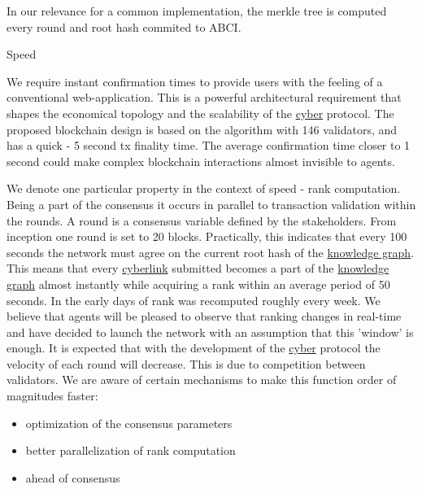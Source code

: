 \documentclass[8pt,oneside]{amsart}
\makeatletter
\newcommand{\linkred}[2]{\href{#1}{\color{red}{#2}}}
\newcommand{\linkgreen}[2]{\href{#1}{\color{green}{#2}}}
\renewcommand\subsection{\@startsection{subsection}
                                    {2}{\z@}
                                    {-3.25ex\@plus -1ex \@minus -.2ex}
                                    {0ex \@plus .2ex}
                                    {\play\Large}
                        }
\newcommand{\titleSection}[1]{\subsection{#1}}
\makeatother
\begin{document}
In our relevance for a common \linkred{https://github.ccom/cybercongress/cyberd}{cyberd} implementation, the merkle tree is computed every round and root hash commited to ABCI.

\titleSection{Speed}\label{speed}

We require instant confirmation times to provide users with the feeling of a conventional web-application. This is a powerful architectural requirement that shapes the economical topology and the scalability of the {\hyperref[cyber]{cyber}} protocol. The proposed blockchain design is based on the \linkgreen{https://ipfs.io/ipfs/QmaMtD7xDgghqgjN62zWZ5TBGFiEjGQtuZBjJ9sMh816KJ}{Tendermint consensus} algorithm with 146 validators, and has a quick - 5 second tx finality time. The average confirmation time closer to 1 second could make complex blockchain interactions almost invisible to agents.

We denote one particular \linkred{https://github.com/cybercongress/cyberd}{cyberd} property in the context of speed - rank computation. Being a part of the consensus it occurs in parallel to transaction validation within the rounds. A round is a consensus variable defined by the stakeholders. From inception one round is set to 20 blocks. Practically, this indicates that every 100 seconds the network must agree on the current root hash of the {\hyperref[knowledge-graph]{knowledge graph}}. This means that every {\hyperref[cyberlinks]{cyberlink}} submitted becomes a part of the {\hyperref[knowledge-graph]{knowledge graph}} almost instantly while acquiring a rank within an average period of 50 seconds. In the early days of \linkred{https://google.com}{Google} rank was recomputed roughly every week. We believe that agents will be pleased to observe that ranking changes in real-time and have decided to launch the network with an assumption that this 'window' is enough. It is expected that with the development of the {\hyperref[cyber]{cyber}} protocol the velocity of each round will decrease. This is due to competition between validators. We are aware of certain mechanisms to make this function order of magnitudes faster:

\begin{itemize}
\item optimization of the consensus parameters
\item better parallelization of rank computation
\item \linkred{https://ipfs.io/ipfs/QmZKchdeBtUeZKvsFbuWY2PHg6qn6jHjUDrg5KjHzDGWHj}{better clock} ahead of consensus
\end{itemize}
\end{document}
